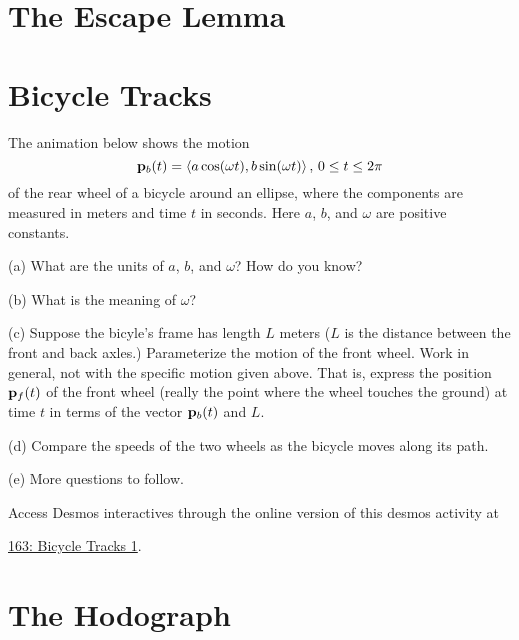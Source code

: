 \documentclass{ximera}
\begin{document}
\section{The Escape Lemma}





\section{Bicycle Tracks}


\begin{exploration}

The animation below shows the motion
\[
   {\bf p}_b(t) = \langle a\cos (\omega t), b \sin (\omega t)  \rangle \, , \, 0\leq t \leq 2\pi 
\]
of the rear wheel of a bicycle around an ellipse, where the components are measured in meters and time $t$ in seconds.
Here $a$, $b$, and $\omega$ are positive constants.

(a) What are the units of $a$, $b$, and $\omega$? How do you know?

(b) What is the meaning of $\omega$?

(c) Suppose the bicyle's frame has length $L$ meters ($L$ is the distance between the front and back axles.) Parameterize the motion of the front wheel. Work in general, not with the specific motion given above. That is, express the position ${\bf p}_f(t)$
of the front wheel (really the point where the wheel touches the ground) at time $t$ in terms of the vector ${\bf p}_b(t)$ and $L$.

(d) Compare the speeds of the two wheels as the bicycle moves along its path.

(e) More questions to follow.

\begin{onlineOnly}
    \begin{center}
\end{center}
\end{onlineOnly}


Access Desmos interactives through the online version of this desmos activity at
 
\href{https://www.desmos.com/calculator/cuo1lynesx}{163: Bicycle Tracks 1}.


\end{exploration}




\section{The Hodograph}
\end{document}
